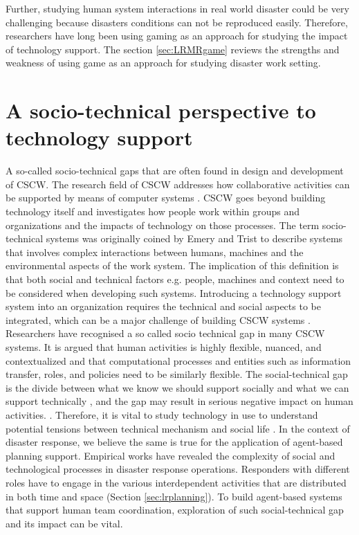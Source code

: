 Further, studying human system interactions in real world disaster could be very challenging because disasters conditions can not be reproduced easily. Therefore, researchers have long been using gaming as an approach for studying the impact of technology support.  The section \ref{sec:LRMRgame} reviews the strengths and weakness of using game as an approach for studying disaster work setting. \\


\section{A socio-technical perspective to technology support} \label{sec:LRSocialTechnical}

A so-called socio-technical gaps that are often found in design and development of \acf{CSCW}. The research field of \ac{CSCW} addresses how collaborative activities can be supported by means of computer systems \cite{Carstensen1999}.  \ac{CSCW} goes beyond building technology itself and investigates how people work within groups and organizations and the impacts of technology on those processes. The term socio-technical systems was originally coined by Emery and Trist \cite{Ropohl1999} to describe systems that involves complex interactions between humans, machines and the environmental aspects of the work system. The implication of this definition is that both social and technical factors e.g. people, machines and context need to be considered when developing such systems. Introducing a technology support system into an organization requires the technical and social aspects to be integrated, which can be a major challenge of building \ac{CSCW} systems \cite{Ackerman2000}. \\

Researchers have recognised a so called socio technical gap in many \ac{CSCW} systems. It is argued that \cite{Ackerman2000}  human activities is highly flexible, nuanced, and contextualized and that computational processes and entities such as information transfer, roles, and policies need to be similarly flexible. The social-technical gap is the divide between what we know we should support socially and what we can support technically \cite{Ackerman2000}, and the gap may result in serious negative impact on human activities. \cite{Bowers1994,Abbott1994a}. Therefore, it is vital to study technology in use to understand potential tensions between technical mechanism and social life \cite{Bowers1994}.  In the context of disaster response, we believe the same is true for the application of agent-based planning support. Empirical works \cite{Kopena2008,Fischer2015,Zerger2003} have revealed the complexity of social and technological processes in disaster response operations. Responders with different roles have to engage in the various interdependent activities that are distributed in both time and space (Section \ref{sec:lrplanning}). To build agent-based systems that support human team coordination, exploration of such social-technical gap and its impact can be vital. \\ 

